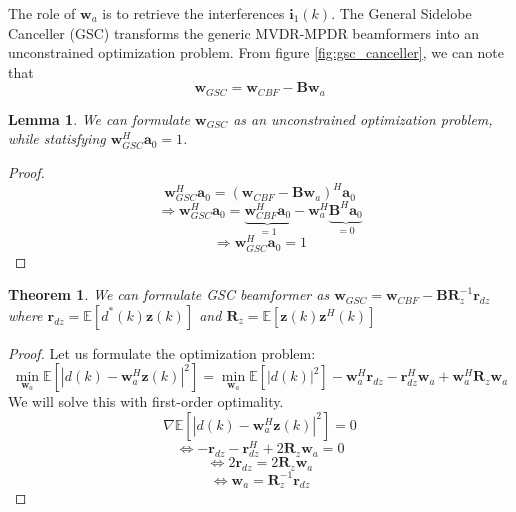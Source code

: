 \documentclass[12pt]{article}
\newtheorem{lemma}{Lemma}
\newtheorem{theorem}{Theorem}
\begin{document}
The role of $\mathbf{w}_a$ is to retrieve the interferences $\mathbf{i}_1(k)$. The General Sidelobe Canceller (GSC) transforms the generic MVDR-MPDR beamformers into an unconstrained optimization problem. From figure \ref{fig:gsc_canceller}, we can note that 
\begin{equation}
    \mathbf{w}_{GSC} = \mathbf{w}_{CBF}-\mathbf{B}\mathbf{w}_a
\end{equation}
\begin{lemma}
    We can formulate $\mathbf{w}_{GSC}$ as an unconstrained optimization problem, while statisfying $\mathbf{w}_{GSC}^H\mathbf{a}_0=1$.
\end{lemma}
\begin{proof}
    \begin{equation*}
        \mathbf{w}_{GSC}^H\mathbf{a}_0 = \left(\mathbf{w}_{CBF}-\mathbf{B}\mathbf{w}_a\right)^H\mathbf{a}_0
    \end{equation*}
    \begin{equation*}
        \Rightarrow \mathbf{w}_{GSC}^H\mathbf{a}_0 = \underbrace{\mathbf{w}_{CBF}^H\mathbf{a}_0}_{=1}-\mathbf{w}_a^H\underbrace{\mathbf{B}^H\mathbf{a}_0}_{=0}
    \end{equation*}
    \begin{equation*}
        \Rightarrow \mathbf{w}_{GSC}^H\mathbf{a}_0 = 1
    \end{equation*}
\end{proof}
\begin{theorem}
    We can formulate GSC beamformer as $\mathbf{w}_{GSC}=\mathbf{w}_{CBF}-\mathbf{B}\mathbf{R}_z^{-1}\mathbf{r}_{dz}$ where $\mathbf{r}_{dz}=\mathbb{E}[d^*(k)\mathbf{z}(k)]$ and $\mathbf{R}_z=\mathbb{E}[\mathbf{z}(k)\mathbf{z}^H(k)]$
\end{theorem}
\begin{proof}
    Let us formulate the optimization problem:
    \begin{equation*}
        \min_{\mathbf{w}_a}\mathbb{E}\left[\left|d(k)-\mathbf{w}_a^H\mathbf{z}(k)\right|^2\right] = \min_{\mathbf{w}_a}\mathbb{E}\left[\left|d(k)\right|^2\right]-\mathbf{w}_a^H\mathbf{r}_{dz}-\mathbf{r}_{dz}^H\mathbf{w}_a+\mathbf{w}_a^H\mathbf{R}_z\mathbf{w}_a
    \end{equation*}
    We will solve this with first-order optimality.
    \begin{equation*}
        \nabla\mathbb{E}\left[\left|d(k)-\mathbf{w}_a^H\mathbf{z}(k)\right|^2\right] = 0
    \end{equation*}
    \begin{equation*}
        \Leftrightarrow -\mathbf{r}_{dz}-\mathbf{r}_{dz}^H+2\mathbf{R}_z\mathbf{w}_a = 0
    \end{equation*}
    \begin{equation*}
        \Leftrightarrow 2\mathbf{r}_{dz} = 2\mathbf{R}_z\mathbf{w}_a
    \end{equation*}
    \begin{equation*}
        \Leftrightarrow \mathbf{w}_a = \mathbf{R}_z^{-1}\mathbf{r}_{dz}
    \end{equation*}
\end{proof}
\end{document}
